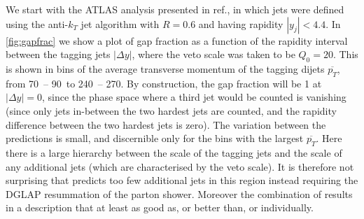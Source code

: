 We start with the ATLAS analysis presented in ref.\@  \cite{Aad:2011jz}, 
in which jets were defined using the anti-$k_T$ jet
algorithm with $R=0.6$ and having rapidity $|y_j|<4.4$.
In \cref{fig:gapfrac} we show a plot of gap fraction as a function of the rapidity interval between the tagging jets
$|\Delta y|$,
where the veto scale was taken to be $Q_0 = 20$\GeV.
This is shown in bins of the average transverse momentum of the tagging dijets $\overline{p_T}$,
from  70\GeV\ -- 90\GeV\ to 240\GeV\ -- 270\GeV.
By construction,
the gap fraction will be 1 at $|\Delta y|=0$, since the phase space where a
third jet would be counted is vanishing (since only jets in-between the two
hardest jets are counted, and the rapidity difference between the two
hardest jets is zero). 
The variation between the predictions is small, and
discernible only for the bins with the largest $\overline{p_T}$.
Here there is a large hierarchy between the scale of the tagging jets
and the scale of any additional jets (which are characterised by the veto scale).
It is therefore not surprising that \HEJ predicts too few additional jets
in this region instead requiring the DGLAP resummation of 
the parton shower. Moreover the combination of \HEJpy results in a description 
that at least as good as, or better than, \py or \HEJ
individually. 






